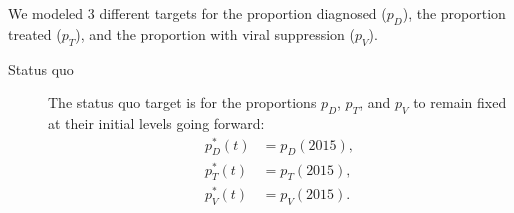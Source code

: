 \documentclass{article}
\begin{document}
We modeled 3 different targets for the proportion diagnosed ($p_D$), the
proportion treated ($p_T$), and the proportion with viral suppression ($p_V$).
\begin{description}
\item[Status quo] The status quo target is for the proportions $p_D$,
  $p_T$, and $p_V$ to remain fixed at their initial levels going
  forward:
  \begin{equation}
    \label{status_quo_target}
    \begin{split}
      p_D^*(t) &= p_D(2015), \\
      p_T^*(t) &= p_T(2015), \\
      p_V^*(t) &= p_V(2015).
    \end{split}
  \end{equation}


\end{description}
\end{document}
